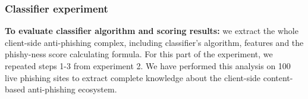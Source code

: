 \documentclass[letterpaper,twocolumn,10pt]{article}
\begin{document}




\subsubsection{Classifier experiment}
\textbf{To evaluate classifier algorithm and scoring results:}
we extract the whole client-side anti-phishing complex, including classifier's algorithm, features and the phishy-ness score calculating formula. For this part of the experiment, we repeated steps 1-3 from experiment 2.
We have performed this analysis on 100 live phishing sites to extract complete knowledge about the client-side content-based anti-phishing ecosystem. 
\end{document}
